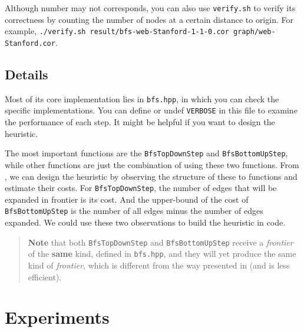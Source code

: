\documentclass[12pt]{article}
\begin{document}
Although number may not corresponds, you can also use \texttt{verify.sh} to verify its correctness by counting the number of nodes at a certain distance to origin. For example, \texttt{./verify.sh result/bfs-web-Stanford-1-1-0.cor graph/web-Stanford.cor}.

\subsection{Details}

Most of its core implementation lies in \texttt{bfs.hpp}, in which you can check the specific implementations. You can define or undef \texttt{VERBOSE} in this file to examine the performance of each step. It might be helpful if you want to design the heuristic.

The most important functions are the \texttt{BfsTopDownStep} and \texttt{BfsBottomUpStep}, while other functions are just the combination of using these two functions. From \cite{6468458}, we can design the heuristic by observing the structure of these to functions and estimate their costs. For \texttt{BfsTopDownStep}, the number of edges that will be expanded in frontier is its cost. And the upper-bound of the cost of \texttt{BfsBottomUpStep} is the number of all edges minus the number of edges expanded. We could use these two observations to build the heuristic in code.

\begin{quote}
	\textbf{Note} that both \texttt{BfsTopDownStep} and \texttt{BfsBottomUpStep} receive a \textit{frontier} of the \textbf{same} kind, defined in \texttt{bfs.hpp}, and they will yet produce the same kind of \textit{frontier}, which is different from the way presented in \cite{6468458} (and is less efficient).
\end{quote}

\section{Experiments}
\end{document}
